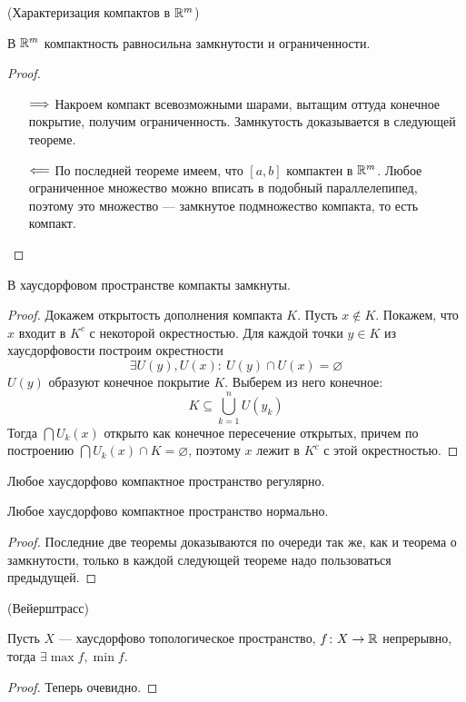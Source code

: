 \begin{theorem}(Характеризация компактов в $\mathbb{R}^m$)

	В $\mathbb{R}^m$ компактность равносильна замкнутости и ограниченности.
\end{theorem}
\begin{proof}
	\enewline
	\begin{itemize}
		\item[$\Longrightarrow$] Накроем компакт всевозможными шарами, вытащим оттуда
			конечное покрытие, получим ограниченность. Замнкутость доказывается
			в следующей теореме.
		\item[$\Longleftarrow$] По последней теореме имеем, что $[a, b]$ компактен в $\mathbb{R}^m$.
			Любое ограниченное множество можно вписать в подобный параллелепипед,
			поэтому это множество --- замкнутое подмножество компакта, то есть компакт.
	\end{itemize}
\end{proof}

\begin{theorem}
	В хаусдорфовом пространстве компакты замкнуты.
\end{theorem}
\begin{proof}
	Докажем открытость дополнения компакта $K$. Пусть $x \notin K$. Покажем,
	что $x$ входит в $K^c$ с некоторой окрестностью. Для каждой точки
	$y \in K$ из хаусдорфовости построим окрестности
\[
	\exists U(y), U(x)\colon~ U(y) \cap U(x) = \varnothing
\]
	$U(y)$ образуют конечное покрытие $K$. Выберем из него конечное:
\[
	K \subseteq \bigcup_{k = 1}^{n}{U(y_k)}
\]
	Тогда $\bigcap{U_k(x)}$ открыто как конечное пересечение открытых, причем
	по построению $\bigcap{U_k(x)} \cap K = \varnothing$, поэтому $x$ лежит
	в $K^c$ с этой окрестностью.
\end{proof}

\begin{theorem}
	Любое хаусдорфово компактное пространство регулярно.
\end{theorem}

\begin{theorem}
	Любое хаусдорфово компактное пространство нормально.
\end{theorem}
\begin{proof}
	Последние две теоремы доказываются по очереди так же, как и теорема
	о замкнутости, только в каждой следующей теореме надо пользоваться предыдущей.
\end{proof}

\begin{theorem}(Вейерштрасс)

	Пусть $X$ --- хаусдорфово топологическое пространство, $f \colon X \to \mathbb{R}$
	непрерывно, тогда $\exists \max{f}, \min{f}$.
\end{theorem}
\begin{proof}
	Теперь очевидно.
\end{proof}


